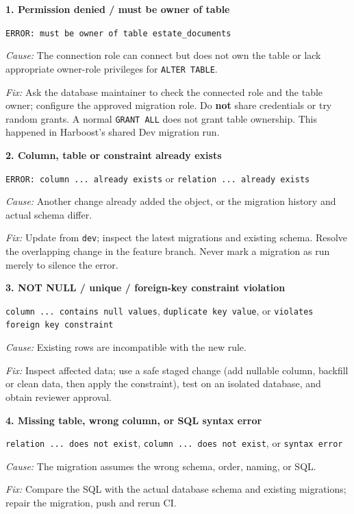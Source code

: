 \documentclass[10pt,a4paper]{article}
\begin{document}
\begin{tcolorbox}[breakable,colback=white,colframe=lightborder,boxrule=.7pt,arc=2mm]
\textbf{1. Permission denied / must be owner of table}\par
\texttt{ERROR: must be owner of table estate\_documents}\par
\textit{Cause:} The connection role can connect but does not own the table or lack appropriate owner-role privileges for \texttt{ALTER TABLE}.\par
\textit{Fix:} Ask the database maintainer to check the connected role and the table owner; configure the approved migration role. Do \textbf{not} share credentials or try random grants. A normal \texttt{GRANT ALL} does not grant table ownership. This happened in Harboost's shared Dev migration run.\par
\medskip
\textbf{2. Column, table or constraint already exists}\par
\texttt{ERROR: column ... already exists} or \texttt{relation ... already exists}\par
\textit{Cause:} Another change already added the object, or the migration history and actual schema differ.\par
\textit{Fix:} Update from \texttt{dev}; inspect the latest migrations and existing schema. Resolve the overlapping change in the feature branch. Never mark a migration as run merely to silence the error.\par
\medskip
\textbf{3. NOT NULL / unique / foreign-key constraint violation}\par
\texttt{column ... contains null values}, \texttt{duplicate key value}, or \texttt{violates foreign key constraint}\par
\textit{Cause:} Existing rows are incompatible with the new rule.\par
\textit{Fix:} Inspect affected data; use a safe staged change (add nullable column, backfill or clean data, then apply the constraint), test on an isolated database, and obtain reviewer approval.\par
\medskip
\textbf{4. Missing table, wrong column, or SQL syntax error}\par
\texttt{relation ... does not exist}, \texttt{column ... does not exist}, or \texttt{syntax error}\par
\textit{Cause:} The migration assumes the wrong schema, order, naming, or SQL.\par
\textit{Fix:} Compare the SQL with the actual database schema and existing migrations; repair the migration, push and rerun CI.\par

\end{tcolorbox}
\end{document}
